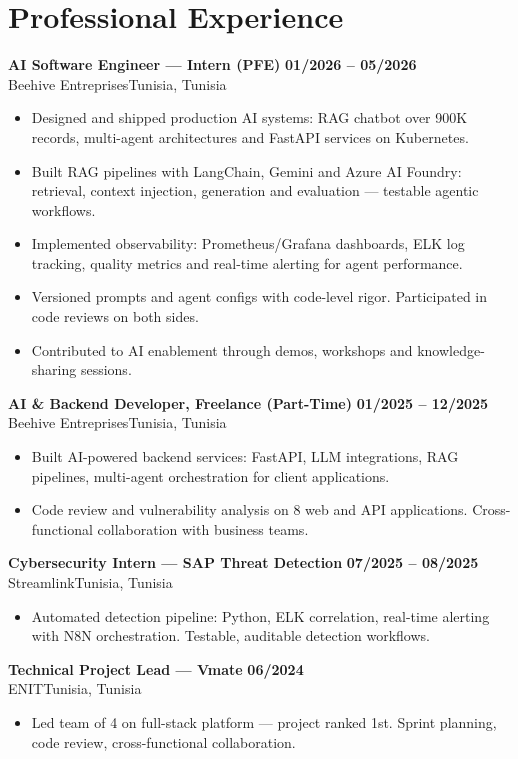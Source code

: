 \documentclass[a4paper,8.5pt]{article}
\newcommand{\cventry}[4]{\textbf{#1} \hfill \textbf{#4}\\[0.2pt]#2{\ifx\relax#3\relax\else, #3\fi}\par\vspace{0.3pt}}
\begin{document}
\section{Professional Experience}
\cventry{AI Software Engineer --- Intern (PFE)}{Beehive Entreprises}{Tunisia}{01/2026 -- 05/2026}
\begin{itemize}
  \item Designed and shipped production AI systems: RAG chatbot over 900K records, multi-agent architectures and FastAPI services on Kubernetes.
  \item Built RAG pipelines with LangChain, Gemini and Azure AI Foundry: retrieval, context injection, generation and evaluation --- testable agentic workflows.
  \item Implemented observability: Prometheus/Grafana dashboards, ELK log tracking, quality metrics and real-time alerting for agent performance.
  \item Versioned prompts and agent configs with code-level rigor. Participated in code reviews on both sides.
  \item Contributed to AI enablement through demos, workshops and knowledge-sharing sessions.
\end{itemize}
\cventry{AI \& Backend Developer, Freelance (Part-Time)}{Beehive Entreprises}{Tunisia}{01/2025 -- 12/2025}
\begin{itemize}
  \item Built AI-powered backend services: FastAPI, LLM integrations, RAG pipelines, multi-agent orchestration for client applications.
  \item Code review and vulnerability analysis on 8 web and API applications. Cross-functional collaboration with business teams.
\end{itemize}
\cventry{Cybersecurity Intern --- SAP Threat Detection}{Streamlink}{Tunisia}{07/2025 -- 08/2025}
\begin{itemize}
  \item Automated detection pipeline: Python, ELK correlation, real-time alerting with N8N orchestration. Testable, auditable detection workflows.
\end{itemize}
\cventry{Technical Project Lead --- Vmate}{ENIT}{Tunisia}{06/2024}
\begin{itemize}
  \item Led team of 4 on full-stack platform --- project ranked 1st. Sprint planning, code review, cross-functional collaboration.
\end{itemize}
\end{document}
